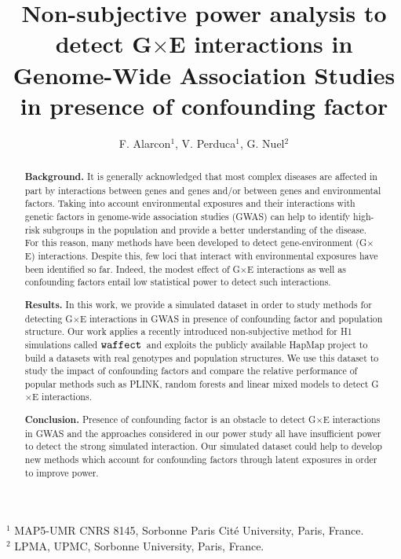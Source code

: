 \documentclass[10pt,a4paper]{article}
\title{Non-subjective power analysis to detect G$\times$E interactions in Genome-Wide Association Studies in presence of confounding factor}
\author{F. Alarcon$^1$, V. Perduca$^1$, G. Nuel$^2$}
\newcommand{\waffect}{${\tt waffect}$\ }
\begin{document}

\maketitle

\hspace{-0.65cm}
$^1$ MAP5-UMR CNRS 8145, Sorbonne Paris Cité University, Paris, France.\\
$^2$ LPMA, UPMC, Sorbonne University, Paris, France.\\



\begin{abstract}

\textbf{Background.} It is generally acknowledged that most complex diseases are affected in part by interactions between genes and genes and/or between genes and environmental factors. Taking into account environmental exposures and their interactions with genetic factors in genome-wide association studies (GWAS) can help to identify high-risk subgroups in the population and provide a better understanding of the disease. For this reason, many methods have been developed to detect  gene-environment (G$\times$E) interactions. Despite this, few loci that interact with environmental exposures have been identified so far. Indeed, the modest effect of G$\times$E interactions as well as confounding factors entail low statistical power to detect such interactions. 


\textbf{Results.}
In this work, we provide a simulated dataset in order to study methods for detecting G$\times$E interactions in GWAS in presence of confounding factor and population structure. Our work applies a recently introduced non-subjective method for H1 simulations called \waffect and exploits the publicly available HapMap project to build a datasets with real genotypes and population structures. We use this dataset to study the impact of confounding factors and compare the relative performance of popular methods such as PLINK, random forests and linear mixed models to detect G$\times$E interactions.

\textbf{Conclusion.}
Presence of confounding factor is an obstacle to detect G$\times$E interactions in GWAS and the approaches considered in our power study all have insufficient power to detect the strong simulated interaction.
Our simulated dataset could help to develop new methods which account for confounding factors through latent exposures in order to improve power.
\end{abstract}
\end{document}
